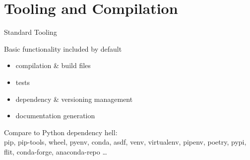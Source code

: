 \documentclass{beamer}
\begin{document}
\section{Tooling and Compilation} 


\begin{frame}{Standard Tooling} 
\vspace{-3em}
\begin{block}
{Basic functionality included by default}
\begin{itemize} [label=$\bullet$] 
\item<2-> compilation \& build files
\item<3-> tests
\item<4-> dependency \& versioning management
\item<5-> documentation generation
\end{itemize}
\end{block}

\pause \pause \pause \pause \pause 
Compare to Python dependency hell: \\
pip, pip-tools, wheel, pyenv, conda, asdf, venv, virtualenv, pipenv, poetry, pypi, flit, conda-forge, anaconda-repo \ldots
\end{frame} 

\end{document}
